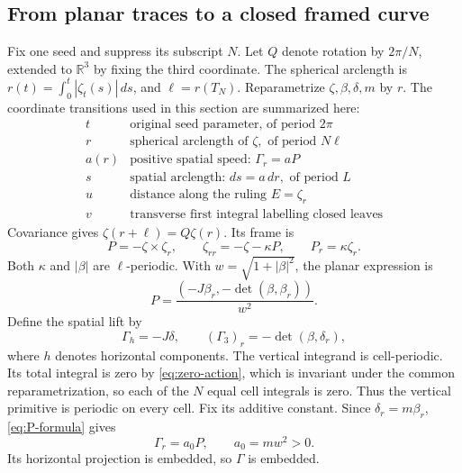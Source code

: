 \documentclass[11pt]{amsart}
\theoremstyle{definition}
\theoremstyle{remark}
\newcommand{\R}{\mathbb R}\newcommand{\Sph}{\mathbb S}
\numberwithin{equation}{section}
\begin{document}
\subsection{From planar traces to a closed framed curve}\label{sec:model-curve}
Fix one seed and suppress its subscript $N$. Let $Q$ denote rotation by
$2\pi/N$, extended to $\R^3$ by fixing the third coordinate. The
spherical arclength is $r(t)=\int_0^t|\zeta_t(s)|\,ds$, and
$\ell=r(T_N)$. Reparametrize $\zeta,\beta,\delta,m$ by $r$.
The coordinate transitions used in this section are summarized here:
\[
\begin{array}{c|l}
 t & \text{original seed parameter, of period }2\pi\\
 r & \text{spherical arclength of }\zeta,\text{ of period }N\ell\\
 a(r) & \text{positive spatial speed: }\Gamma_r=aP\\
 s & \text{spatial arclength: }ds=a\,dr,\text{ of period }L\\
 u & \text{distance along the ruling }E=\zeta_r\\
 v & \text{transverse first integral labelling closed leaves}
\end{array}
\]
Covariance gives
$\zeta(r+\ell)=Q\zeta(r)$. Its frame is
\begin{equation}\label{eq:spherical-frame}
 P=-\zeta\times\zeta_r,\qquad
 \zeta_{rr}=-\zeta-\kappa P,\qquad P_r=\kappa\zeta_r.
\end{equation}
Both $\kappa$ and $|\beta|$ are $\ell$-periodic. With
$w=\sqrt{1+|\beta|^2}$, the planar expression is
\begin{equation}\label{eq:P-formula}
 P=\frac{(-J\beta_r,-\det(\beta,\beta_r))}{w^2}.
\end{equation}
Define the spatial lift by
\begin{equation}\label{eq:spatial-lift}
 \Gamma_h=-J\delta,\qquad
 (\Gamma_3)_r=-\det(\beta,\delta_r),
\end{equation}
where $h$ denotes horizontal components. The vertical integrand is
cell-periodic. Its total integral is zero by \eqref{eq:zero-action},
which is invariant under the common reparametrization, so
each of the $N$ equal cell integrals is zero. Thus the vertical primitive
is periodic on every cell. Fix its additive constant. Since
$\delta_r=m\beta_r$, \eqref{eq:P-formula} gives
\begin{equation}\label{eq:initial-speed}
 \Gamma_r=a_0P,\qquad a_0=mw^2>0.
\end{equation}
Its horizontal projection is embedded, so $\Gamma$ is embedded.
\end{document}
